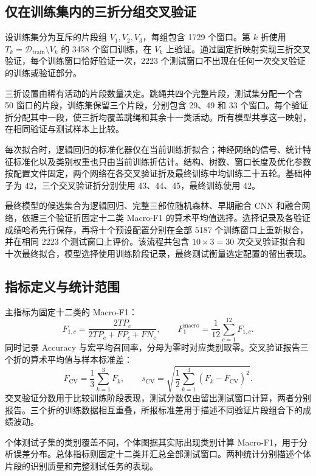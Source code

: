 \documentclass[UTF8,zihao=-4,a4paper,fontset=windows]{ctexart}
\begin{document}
\subsection{仅在训练集内的三折分组交叉验证}
设训练集分为互斥的片段组 $V_1,V_2,V_3$，每组包含 1729 个窗口。第 $k$ 折使用 $T_k=\mathcal D_{\mathrm{train}}\setminus V_k$ 的 3458 个窗口训练，在 $V_k$ 上验证。通过固定折映射实现三折交叉验证\cite{predefined}，每个训练窗口恰好验证一次，2223 个测试窗口不出现在任何一次交叉验证的训练或验证部分。

三折设置由稀有活动的片段数量决定。跳绳共四个完整片段，测试集分配一个含 50 窗口的片段，训练集保留三个片段，分别包含 29、49 和 33 个窗口。每个验证折分配其中一段，使三折均覆盖跳绳和其余十一类活动。所有模型共享这一映射，在相同验证与测试样本上比较。

每次拟合时，逻辑回归的标准化器仅在当前训练折拟合；神经网络的信号、统计特征标准化以及类别权重也只由当前训练折估计。结构、树数、窗口长度及优化参数按配置文件固定，两个网络在各交叉验证折及最终训练中均训练二十五轮。基础种子为 42，三个交叉验证折分别使用 43、44、45，最终训练使用 42。

最终模型的候选集合为逻辑回归、完整三部位随机森林、早期融合 CNN 和融合网络，依据三个验证折固定十二类 Macro-F1 的算术平均值选择。选择记录及各验证成绩哈希先行保存，再将十个预设配置分别在全部 5187 个训练窗口上重新拟合，并在相同 2223 个测试窗口上评价。该流程共包含 $10\times3=30$ 次交叉验证拟合和十次最终拟合，模型选择使用训练阶段记录，最终测试衡量选定配置的留出表现。

\subsection{指标定义与统计范围}
主指标为固定十二类的 Macro-F1：
\begin{equation}
F_{1,c}=\frac{2TP_c}{2TP_c+FP_c+FN_c},\qquad
F_1^{\mathrm{macro}}=\frac1{12}\sum_{c=1}^{12}F_{1,c}.
\end{equation}
同时记录 Accuracy 与宏平均召回率，分母为零时对应类别取零。交叉验证报告三个折的算术平均值与样本标准差：
\begin{equation}
\bar F_{\mathrm{CV}}=\frac13\sum_{k=1}^3F_k,\qquad
s_{\mathrm{CV}}=\sqrt{\frac1{2}\sum_{k=1}^3(F_k-\bar F_{\mathrm{CV}})^2}.
\end{equation}
交叉验证分数用于比较训练阶段表现，测试分数仅由留出测试窗口计算，两者分别报告。三个折的训练数据相互重叠，所报标准差用于描述不同验证片段组合下的成绩波动。

个体测试子集的类别覆盖不同，个体图据其实际出现类别计算 Macro-F1，用于分析误差分布。总体指标则固定十二类并汇总全部测试窗口。两种统计分别描述个体片段的识别质量和完整测试任务的表现。
\end{document}

